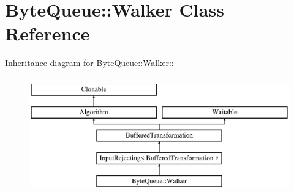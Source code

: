 \hypertarget{class_byte_queue_1_1_walker}{
\section{ByteQueue::Walker Class Reference}
\label{class_byte_queue_1_1_walker}
}
Inheritance diagram for ByteQueue::Walker::\begin{figure}[H]
\begin{center}
\leavevmode
\includegraphics[height=5cm]{class_byte_queue_1_1_walker}
\end{center}
\end{figure}
